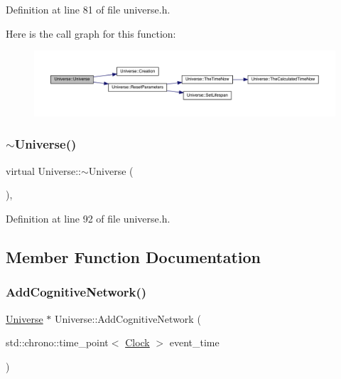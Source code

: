 Definition at line 81 of file universe.\+h.

Here is the call graph for this function\+:\nopagebreak
\begin{figure}[H]
\begin{center}
\leavevmode
\includegraphics[width=350pt]{class_universe_a03af7455263d3028b55ca5dc93ebb6ba_cgraph}
\end{center}
\end{figure}
\mbox{\label{class_universe_ad4d90f6f2727992762c6b409d3d3d228}} 
\subsubsection{\texorpdfstring{$\sim$\+Universe()}{~Universe()}}
{\footnotesize\ttfamily virtual Universe\+::$\sim$\+Universe (\begin{DoxyParamCaption}{ }\end{DoxyParamCaption})\hspace{0.3cm}{\ttfamily [inline]}, {\ttfamily [virtual]}}



Definition at line 92 of file universe.\+h.



\subsection{Member Function Documentation}
\mbox{\label{class_universe_ab682307c963836cd81b35b5604bd7064}} 
\subsubsection{\texorpdfstring{Add\+Cognitive\+Network()}{AddCognitiveNetwork()}}
{\footnotesize\ttfamily \hyperlink{class_universe}{Universe} $\ast$ Universe\+::\+Add\+Cognitive\+Network (\begin{DoxyParamCaption}\item[{std\+::chrono\+::time\+\_\+point$<$ \hyperlink{universe_8h_a0ef8d951d1ca5ab3cfaf7ab4c7a6fd80}{Clock} $>$}]{event\+\_\+time }\end{DoxyParamCaption})}



